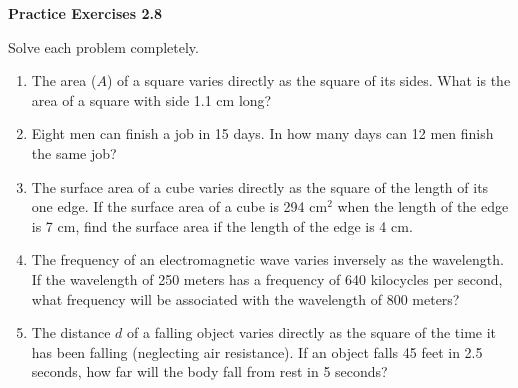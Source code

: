 \vspace{0.3ex}
\noindent\textbf{Practice Exercises 2.8}

\vspace{0.2ex}

Solve each problem completely.

\begin{enumerate}[noitemsep, label = \color{blue}\arabic*. ]
\item The area ($A$) of a square varies directly as the square of its sides. What is the area of a square with side 1.1 cm long?
  
\item Eight men can finish a job in 15 days. In how many days can 12 men finish the same job?
  
\item The surface area of a cube varies directly as the square of the length of its one edge. If the surface area of a cube is 294 cm$^2$ when the length of the edge is 7 cm, find the surface area if the length of the edge is 4 cm.

\item The frequency of an electromagnetic wave varies inversely as the wavelength. If the wavelength of 250 meters has a frequency of 640 kilocycles per second, what frequency will be associated with the wavelength of 800 meters?
  
\item The distance $d$ of a falling object varies directly as the square of the time it has been falling (neglecting air resistance). If an object falls 45 feet in 2.5 seconds, how far will the body fall from rest in 5 seconds?

  \end{enumerate}


  

 

 

 

 


